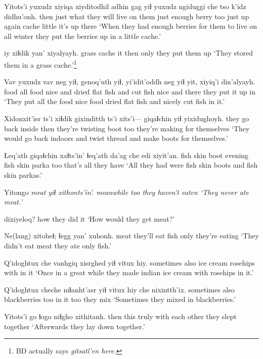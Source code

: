 \documentclass[12pt]{article}
\begin{document}
\gll Yitots'i yuxudz {xiyiqa xiyditodhil} adhin gag yiɬ yuxudz ngiduggi che tso k'idz didhu'onh.
then just {what they will live on them} {just enough} berry too just up again cache little {it's up there} 
\glt `When they had enough berries for them to live on all winter they put the berries up in a little cache.'
\glend

 iy xiɬdik yan' xiyalyayh.
{grass cache} it then only {they put them up}
\glt  `They stored them in a grass cache.'\footnote{BD actually says \em gitsatl'en \em here.}
\glend

\gll Vav yuxudz vav neg yiɬ, genoq'uth yiɬ, yi'idit'oddh neg yiɬ yit, {xiyiq'i din'alyayh.}
food all food nice and {dried flat fish} and {cut fish} nice and there {they put it up in}
\glt `They put all the food  nice food dried flat fish and nicely cut fish in it.'
\glend

\gll Xidonxit'isr ts'i xiɬdik gixinditth ts'i xits'i--- giqaɬchin yiɬ yixidughoyh.
{they go back inside} {} then {they're twisting} {} {} boot too {they're making for themselves}
\glt `They would go back indoors and twist thread and make boots for themselves.'
\glend

\gll Łeq'ath giqaɬchin xaɬts'in' ɬeq'ath da'ag che {edi xiyit'an}.
{fish skin} boot evening {fish skin} parka too {that's all they have}
\glt `All they had were fish skin boots and fish skin parkas.'
\glend

\gll Yitongo \em meat yiɬ xithonts'in'.
meanwhile {} too {they haven't eaten}
\glt `They never ate meat.'
\glend

 dixiyeloq?
how {they did it}
\glt `How would they get meat?'
\glend

\gll Ne(lang) xitoheɬ; ɬegg yan' xuhonh.
meat {they'll eat} fish only {they're eating}
\glt `They didn't eat meat they ate only fish.'
\glend

\gll Q'idoghtux che vanhgiq xisrghed yiɬ {vitux hiy.}
sometimes also {ice cream} {rosehips} with {in it}
\glt `Once in a great while they made indian ice cream with rosehips in it.'
\glend

\gll Q'idoghtux cheche niɬanht'asr yiɬ {vitux hiy} che nixintth'ix.
sometimes also blackberries too {in it} too {they mix}
\glt `Sometimes they mixed in blackberries.'
\glend

\gll Yitots'i go ɬogo niɬgho xithitanh.
then this truly {with each other} {they slept together}
\glt `Afterwards they lay down together.'
\glend
\end{document}
